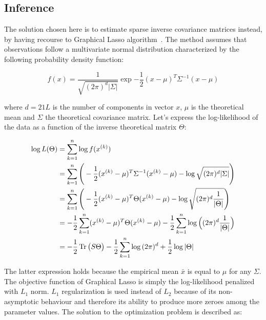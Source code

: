     \subsection{Inference}

        The solution chosen here is to estimate sparse inverse covariance matrices instead,
        by having recourse to Graphical Lasso algorithm~\cite{graphicalLasso}.
        The method assumes that observations follow a multivariate normal distribution
        characterized by the following probability density function:

        \begin{equation}
            f(x) = \frac{1}{\sqrt{(2\pi)^d \vert\Sigma\vert}} \exp{-\frac{1}{2} (x - \mu)^T \Sigma^{-1} (x - \mu)}
        \end{equation}

        where $d=21L$ is the number of components in vector $x$, $\mu$ is the theoretical mean and $\Sigma$ the theoretical covariance matrix.
        Let's express the log-likelihood of the data as a function of the inverse theoretical matrix $\Theta$:

        \begin{equation}
            \begin{split}
                \log{L}(\Theta) & = \sum\limits_{k=1}^{n} \log{f(x^{(k)})} \\
                & = \sum\limits_{k=1}^{n} \Bigg( -\frac{1}{2} (x^{(k)} - \mu)^T \Sigma^{-1} (x^{(k)} - \mu) - \log{\sqrt{(2\pi)^d \vert\Sigma\vert}} \Bigg) \\
                & = \sum\limits_{k=1}^{n} \Bigg( -\frac{1}{2} (x^{(k)} - \mu)^T \Theta (x^{(k)} - \mu) - \log{\sqrt{(2\pi)^d \frac{1}{\vert\Theta\vert}}} \Bigg) \\
                & = -\frac{1}{2} \sum\limits_{k=1}^{n} (x^{(k)} - \mu)^T \Theta (x^{(k)} - \mu)
                    - \frac{1}{2} \sum\limits_{k=1}^{n} \log{\Big((2\pi)^d \frac{1}{\vert\Theta\vert}\Big)} \\
                & = -\frac{1}{2} \trace\big(S \Theta\big) - \frac{1}{2} \sum\limits_{k=1}^{n} \log{(2\pi)^d} + \frac{1}{2} \log{\vert\Theta\vert} \\
            \end{split}  %
        \end{equation}

        The latter expression holds because the empirical mean $\bar{x}$ is equal to $\mu$ for any $\Sigma$.
        The objective function of Graphical Lasso is simply the log-likelihood penalized with $L_1$ norm. $L_1$ regularization is used instead of $L_2$ because
        of its non-asymptotic behaviour and therefore its ability to produce more zeroes among the parameter values.
        The solution to the optimization problem is described as:

